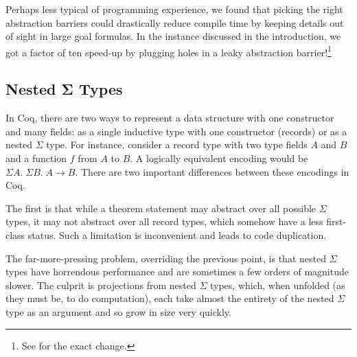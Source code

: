 Perhaps less typical of programming experience, we found that picking the right abstraction barriers could drastically reduce compile time by keeping details out of sight in large goal formulas.
In the instance discussed in the introduction, we got a factor of ten speed-up by plugging holes in a leaky abstraction barrier!\footnote{See  for the exact change.}

\subsection{Nested Σ Types} \label{sec:nested-sigma-types}
  In Coq, there are two ways to represent a data structure with one constructor and many fields:
  as a single inductive type with one constructor (records) or as a nested $\Sigma$ type.
  For instance, consider a record type with two type fields $A$ and $B$ and a function $f$ from $A$ to $B$.
  A logically equivalent encoding would be $\Sigma A. \; \Sigma B. \; A \to B$.
  There are two important differences between these encodings in Coq.

  \label{sec:prim-record-proj}
  The first is that while a theorem statement may abstract over all possible $\Sigma$ types, it may not abstract over all record types, which somehow have a less first-class status.
  Such a limitation is inconvenient and leads to code duplication.

  The far-more-pressing problem, overriding the previous point, is that nested $\Sigma$ types have horrendous performance and are sometimes a few orders of magnitude slower.
  The culprit is projections from nested $\Sigma$ types, which, when unfolded (as they must be, to do computation), each take almost the entirety of the nested $\Sigma$ type as an argument and so grow in size very quickly.

